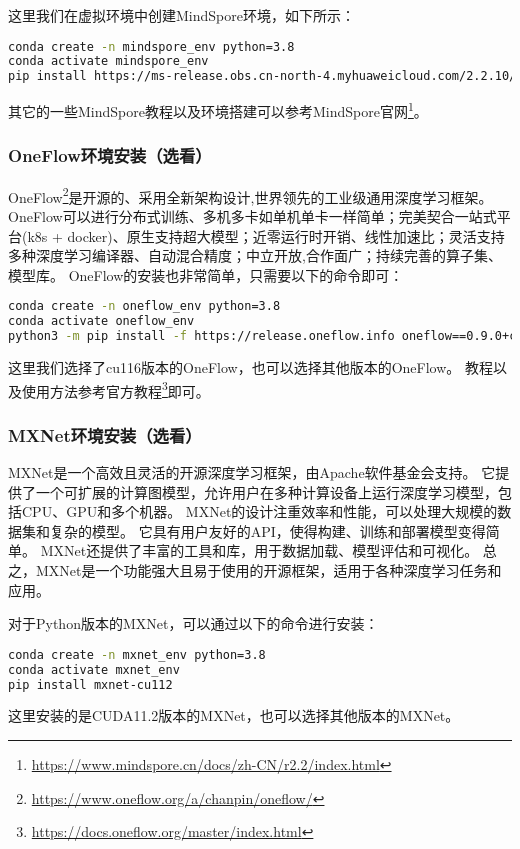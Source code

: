 \documentclass[lang=cn,a4paper,newtx]{elegantpaper}
\begin{document}
这里我们在虚拟环境中创建MindSpore环境，如下所示：
\begin{lstlisting}[language=bash]
conda create -n mindspore_env python=3.8
conda activate mindspore_env
pip install https://ms-release.obs.cn-north-4.myhuaweicloud.com/2.2.10/MindSpore/unified/x86_64/mindspore-2.2.10-cp38-cp38-linux_x86_64.whl --trusted-host ms-release.obs.cn-north-4.myhuaweicloud.com -i https://pypi.tuna.tsinghua.edu.cn/simple
\end{lstlisting}

其它的一些MindSpore教程以及环境搭建可以参考MindSpore官网\footnote{\url{https://www.mindspore.cn/docs/zh-CN/r2.2/index.html}}。

\subsubsection{OneFlow环境安装（选看）}
OneFlow\footnote{\url{https://www.oneflow.org/a/chanpin/oneflow/}}是开源的、采用全新架构设计,世界领先的工业级通用深度学习框架。
OneFlow可以进行分布式训练、多机多卡如单机单卡一样简单；完美契合一站式平台(k8s + docker)、原生支持超大模型；近零运行时开销、线性加速比；灵活支持多种深度学习编译器、自动混合精度；中立开放,合作面广；持续完善的算子集、模型库。 
OneFlow的安装也非常简单，只需要以下的命令即可：
\begin{lstlisting}[language=bash]
conda create -n oneflow_env python=3.8
conda activate oneflow_env
python3 -m pip install -f https://release.oneflow.info oneflow==0.9.0+cu116
\end{lstlisting}

这里我们选择了cu116版本的OneFlow，也可以选择其他版本的OneFlow。
教程以及使用方法参考官方教程\footnote{\url{https://docs.oneflow.org/master/index.html}}即可。

\subsubsection{MXNet环境安装（选看）}
MXNet是一个高效且灵活的开源深度学习框架，由Apache软件基金会支持。
它提供了一个可扩展的计算图模型，允许用户在多种计算设备上运行深度学习模型，包括CPU、GPU和多个机器。
MXNet的设计注重效率和性能，可以处理大规模的数据集和复杂的模型。
它具有用户友好的API，使得构建、训练和部署模型变得简单。
MXNet还提供了丰富的工具和库，用于数据加载、模型评估和可视化。
总之，MXNet是一个功能强大且易于使用的开源框架，适用于各种深度学习任务和应用。

对于Python版本的MXNet，可以通过以下的命令进行安装：
\begin{lstlisting}[language=bash]
conda create -n mxnet_env python=3.8
conda activate mxnet_env
pip install mxnet-cu112
\end{lstlisting}
这里安装的是CUDA11.2版本的MXNet，也可以选择其他版本的MXNet。
\end{document}
